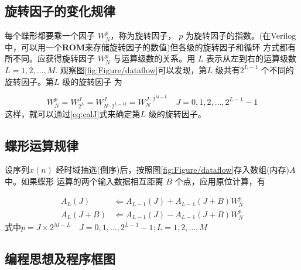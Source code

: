 \subsection{旋转因子的变化规律}%
\label{sub:xuan_zhuan_yin_zi_de_bian_hua_gui_lu_}

每个蝶形都要乘一个因子 $W_N^p$，称为旋转因子， $p$ 为旋转因子的指数。(在Verilog中，可以用一个\textbf{ROM}来存储旋转因子的数值)但各级的旋转因子和循环
方式都有所不同。应获得旋转因子 $W_N^p$ 与运算级数的关系。用 $L$ 表示从左到右的运算级数 $L=1,2,\dots,M$.
观察图\ref{fig:Figure/dataflow}可以发现，第$L$ 级共有$2^{L-1}$ 个不同的旋转因子。第$L$ 级的旋转因子
为

\begin{equation}\label{eq:calJ}
    W_N^p=W_{2^L}^J=W_{N\cdot 2^{L-M}}^J=W_N^{J\cdot 2^{M-L}} \quad J=0,1,2,\dots,2^{L-1}-1
\end{equation}
这样，就可以通过\ref{eq:calJ}式来确定第$L$ 级的旋转因子。

\subsection{蝶形运算规律}%
\label{sub:die_xing_yun_suan_gui_lu_}

设序列$x(n)$ 经时域抽选(倒序)后，按照图\ref{fig:Figure/dataflow}存入数组(内存)$A$中。如果蝶形
运算的两个输入数据相互距离 $B$ 个点，应用原位计算，有

\begin{equation*}
    \begin{aligned}
        A_L(J)&\Leftarrow A_{L-1}(J)+A_{L-1}(J+B)W_N^p\\
        A_L(J+B)&\Leftarrow A_{L-1}(J)-A_{L-1}(J+B)W_N^p
    \end{aligned}
\end{equation*}
式中$p=J\times 2^{M-L}\quad J=0,1,\dots,2^{L-1}-1;L=1,2,\dots,M$

\subsection{编程思想及程序框图}%
\label{sub:bian_cheng_si_xiang_}

